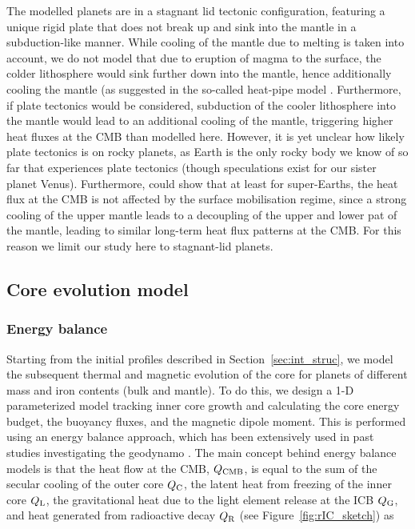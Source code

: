 \documentclass[draft]{agujournal2019} %
\begin{document}
The modelled planets are in a stagnant lid tectonic configuration, featuring a unique rigid plate that does not break up and sink into the mantle in a subduction-like manner. While cooling of the mantle due to melting is taken into account, we do not model that due to eruption of magma to the surface, the colder lithosphere would sink further down into the mantle, hence additionally cooling the mantle (as suggested in the so-called heat-pipe model \cite{moore2013heat}. Furthermore, if plate tectonics would be considered, subduction of the cooler lithosphere into the mantle would lead to an additional cooling of the mantle, triggering higher heat fluxes at the CMB than modelled here. However, it is yet unclear how likely plate tectonics is on rocky planets, as Earth is the only rocky body we know of so far that experiences plate tectonics (though speculations exist for our sister planet Venus). Furthermore,  could show that at least for super-Earths, the heat flux at the CMB is not affected by the surface mobilisation regime, since a strong cooling of the upper mantle leads to a decoupling of the upper and lower pat of the mantle, leading to similar long-term heat flux patterns at the CMB. For this reason we limit our study here to stagnant-lid planets.


\subsection{Core evolution model}\label{sec:evolution_model}

\subsubsection{Energy balance}

Starting from the initial profiles described in Section~\ref{sec:int_struc}, we model the subsequent thermal and magnetic evolution of the core for planets of different mass and iron contents (bulk and mantle). To do this, we design a 1-D parameterized model tracking inner core growth and calculating the core energy budget, the buoyancy fluxes, and the magnetic dipole moment. This is performed using an energy balance approach, which has been extensively used in past studies investigating the geodynamo \cite{gubbins1977energetics,lister1995strength,braginsky1995equations,nimmo2007energetics,labrosse_thermal_2003}. The main concept behind energy balance models is that the heat flow at the CMB, $Q_{\rm CMB}$, is equal to the sum of the secular cooling of the outer core $Q_{\rm C}$, the latent heat from freezing of the inner core $Q_{\rm L}$, the gravitational heat due to the light element release at the ICB $Q_{\rm G}$, and heat generated from radioactive decay $Q_{\rm R}$ (see Figure~\ref{fig:rIC_sketch}) as 
\end{document}
